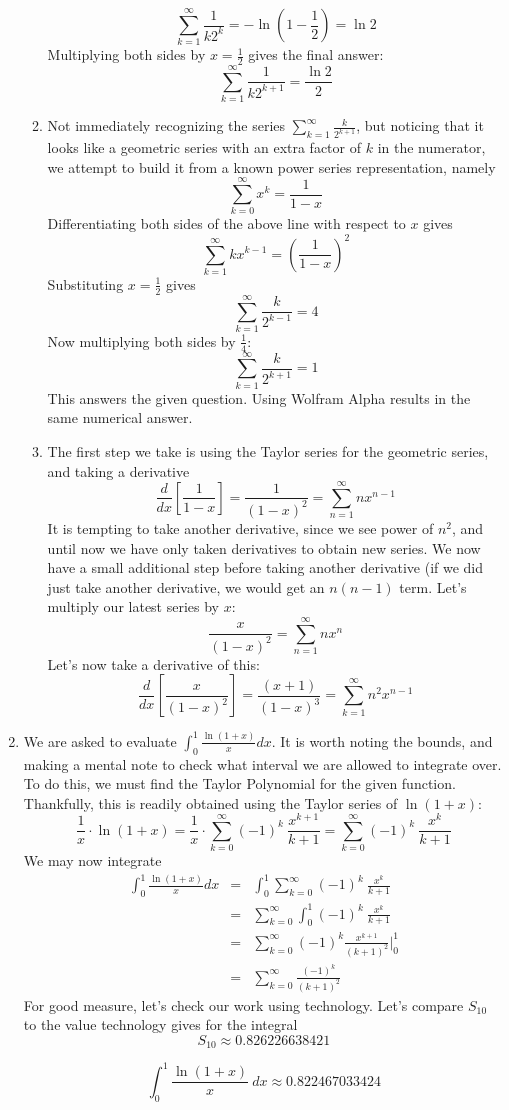 \documentclass{article}
\begin{document}
\begin{enumerate}
\begin{enumerate}
         $$ \sum_{k=1}^\infty \frac{1}{k2^k} = -\ln{(1-\frac{1}{2})} = \ln{2}$$
         Multiplying both sides by $x=\frac{1}{2}$ gives the final answer:
          $$ \sum_{k=1}^\infty \frac{1}{k2^{k+1}} =  \frac{\ln{2}}{2}$$
         \item  Not immediately recognizing the series
         $\sum_{k=1}^\infty \frac{k}{2^{k+1}}$, but noticing that it looks like a geometric series with an extra factor of $k$ in the numerator, we attempt to build it from a known power series representation, namely
         $$ \sum_{k=0}^\infty x^k = \frac{1}{1-x}$$
         Differentiating both sides of the above line with respect to $x$ gives
        $$ \sum_{k=1}^\infty kx^{k-1} = \left(\frac{1}{1-x}\right)^2$$
        Substituting $x=\frac{1}{2}$ gives
        $$ \sum_{k=1}^\infty \frac{k}{2^{k-1}} = 4$$
        Now multiplying both sides by $\frac{1}{4}$:
        $$ \sum_{k=1}^\infty \frac{k}{2^{k+1}} = 1$$
    This answers the given question. Using Wolfram Alpha results in the same numerical answer.
    \item The first step we take is using the Taylor series for the geometric series, and taking a derivative
    \[\frac{d}{dx}\left[\frac{1}{1-x}\right]= \frac{1}{(1-x)^2} = \sum_{n=1}^\infty nx^{n-1}\]
    It is tempting to take another derivative, since we see power of $n^2$, and until now we have only taken derivatives to obtain new series. We now have a small additional step before taking another derivative (if we did just take another derivative, we would get an $n(n-1)$ term.  Let's multiply our latest series by $x$:
    \[ \frac{x}{(1-x)^2} = \sum_{n=1}^\infty nx^{n}\]
    Let's now take a derivative of this:
    \[\frac{d}{dx}\left[\frac{x}{(1-x)^2} \right] =\frac{(x + 1)}{(1 - x)^3}= \sum_{k=1}^\infty n^2x^{n-1}\]
    \end{enumerate}
    \item We are asked to evaluate $\int_0^1 \frac{\ln(1+x)}{x} dx$. It is worth noting the bounds, and making a mental note to check what interval we are allowed to integrate over. To do this, we must find the Taylor Polynomial for the given function.  Thankfully, this is readily obtained using the Taylor series of $\ln(1+x)$:
    \[\frac{1}{x}\cdot \ln(1+x) = \frac{1}{x}\cdot \sum_{k=0}^\infty (-1)^k\ \frac{x^{k+1}}{k+1} = \sum_{k=0}^\infty (-1)^k\ \frac{x^{k}}{k+1}   \]
    We may now integrate
    \begin{eqnarray*}
    \int_0^1 \frac{\ln(1+x)}{x} dx &=& \int_0^1 \sum_{k=0}^\infty (-1)^k\ \frac{x^{k}}{k+1} \\[1em]
    &=&  \sum_{k=0}^\infty \int_0^1(-1)^k\ \frac{x^{k}}{k+1} \\[1em]
    &=&  \sum_{k=0}^\infty (-1)^k \frac{x^{k+1}}{(k+1)^2}\biggr|_0^1 \\[1em]
    &=&  \sum_{k=0}^\infty  \frac{(-1)^k}{(k+1)^2}
    \end{eqnarray*}
    For good measure, let's check our work using technology. Let's compare $S_{10}$ to the value technology gives for the integral
    \[S_{10} \approx 0.826226638421\]
    
    \[\int_0^1 \frac{\ln(1+x)}{x}\ dx \approx 0.822467033424
\]
    \end{enumerate}
\end{document}
